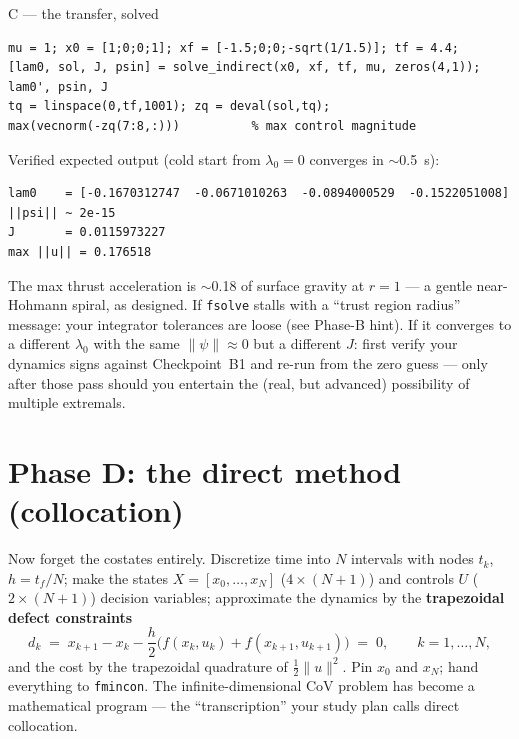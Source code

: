 \documentclass[11pt,letterpaper]{article}
\newcommand{\half}{\tfrac12}
\begin{document}
\begin{checkpoint}{C --- the transfer, solved}
\begin{verbatim}
mu = 1; x0 = [1;0;0;1]; xf = [-1.5;0;0;-sqrt(1/1.5)]; tf = 4.4;
[lam0, sol, J, psin] = solve_indirect(x0, xf, tf, mu, zeros(4,1));
lam0', psin, J
tq = linspace(0,tf,1001); zq = deval(sol,tq);
max(vecnorm(-zq(7:8,:)))          % max control magnitude
\end{verbatim}
Verified expected output (cold start from $\lambda_0 = 0$ converges in
$\sim$0.5~s):
\begin{verbatim}
lam0    = [-0.1670312747  -0.0671010263  -0.0894000529  -0.1522051008]
||psi|| ~ 2e-15
J       = 0.0115973227
max ||u|| = 0.176518
\end{verbatim}
The max thrust acceleration is $\sim$0.18 of surface gravity at $r{=}1$ ---
a gentle near-Hohmann spiral, as designed. If \texttt{fsolve} stalls with a
``trust region radius'' message: your integrator tolerances are loose (see
Phase-B hint). If it converges to a different $\lambda_0$ with the same
$\|\psi\| \approx 0$ but a different $J$: first verify your dynamics signs
against Checkpoint~B1 and re-run from the zero guess --- only after those
pass should you entertain the (real, but advanced) possibility of multiple
extremals.
\end{checkpoint}

\section{Phase D: the direct method (collocation)}

Now forget the costates entirely. Discretize time into $N$ intervals with
nodes $t_k$, $h = t_f/N$; make the states $X = [x_0, \dots, x_N]$
($4\times(N{+}1)$) and controls $U$ ($2\times(N{+}1)$) decision variables;
approximate the dynamics by the \textbf{trapezoidal defect constraints}
\[
  d_k \;=\; x_{k+1} - x_k - \frac{h}{2}\bigl(f(x_k,u_k) + f(x_{k+1},u_{k+1})\bigr)
  \;=\; 0,
  \qquad k = 1,\dots,N,
\]
and the cost by the trapezoidal quadrature of $\half\|u\|^2$. Pin
$x_0$ and $x_N$; hand everything to \texttt{fmincon}. The infinite-dimensional
CoV problem has become a mathematical program --- the ``transcription'' your
study plan calls direct collocation.
\end{document}
